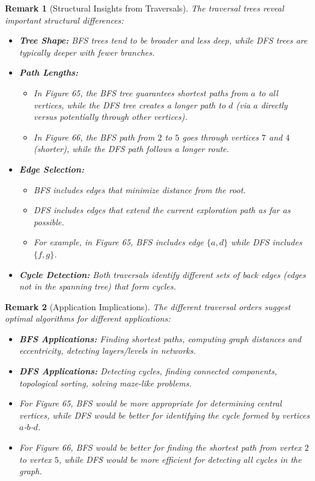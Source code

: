 \documentclass{article}
\newtheorem{remark}{Remark}
\theoremstyle{definition}
\begin{document}
\begin{remark}[Structural Insights from Traversals]
The traversal trees reveal important structural differences:
\begin{itemize}
\item \textbf{Tree Shape:} BFS trees tend to be broader and less deep, while DFS trees are typically deeper with fewer branches.

\item \textbf{Path Lengths:} 
  \begin{itemize}
  \item In Figure 65, the BFS tree guarantees shortest paths from $a$ to all vertices, while the DFS tree creates a longer path to $d$ (via $a$ directly versus potentially through other vertices).
  \item In Figure 66, the BFS path from $2$ to $5$ goes through vertices $7$ and $4$ (shorter), while the DFS path follows a longer route.
  \end{itemize}
  
\item \textbf{Edge Selection:}
  \begin{itemize}
  \item BFS includes edges that minimize distance from the root.
  \item DFS includes edges that extend the current exploration path as far as possible.
  \item For example, in Figure 65, BFS includes edge $\{a,d\}$ while DFS includes $\{f,g\}$.
  \end{itemize}
  
\item \textbf{Cycle Detection:} Both traversals identify different sets of back edges (edges not in the spanning tree) that form cycles.
\end{itemize}
\end{remark}

\begin{remark}[Application Implications]
The different traversal orders suggest optimal algorithms for different applications:
\begin{itemize}
\item \textbf{BFS Applications:} Finding shortest paths, computing graph distances and eccentricity, detecting layers/levels in networks.

\item \textbf{DFS Applications:} Detecting cycles, finding connected components, topological sorting, solving maze-like problems.

\item For Figure 65, BFS would be more appropriate for determining central vertices, while DFS would be better for identifying the cycle formed by vertices $a$-$b$-$d$.

\item For Figure 66, BFS would be better for finding the shortest path from vertex $2$ to vertex $5$, while DFS would be more efficient for detecting all cycles in the graph.
\end{itemize}
\end{remark}
\end{document}
